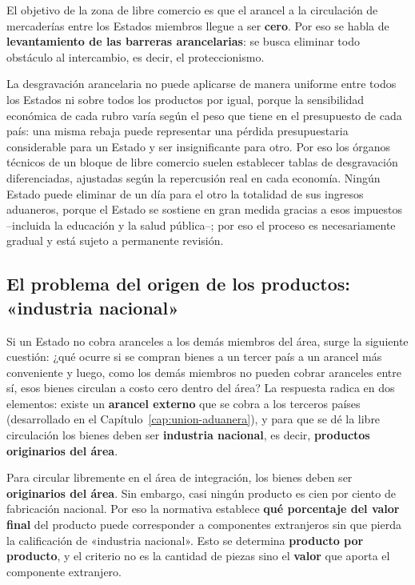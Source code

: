 \documentclass[12pt,oneside]{book}
\begin{document}
\begin{importante}
El objetivo de la zona de libre comercio es que el arancel a la circulación de mercaderías entre los Estados miembros llegue a ser \textbf{cero}. Por eso se habla de \textbf{levantamiento de las barreras arancelarias}: se busca eliminar todo obstáculo al intercambio, es decir, el proteccionismo.
\end{importante}

La desgravación arancelaria no puede aplicarse de manera uniforme entre todos los Estados ni sobre todos los productos por igual, porque la sensibilidad económica de cada rubro varía según el peso que tiene en el presupuesto de cada país: una misma rebaja puede representar una pérdida presupuestaria considerable para un Estado y ser insignificante para otro. Por eso los órganos técnicos de un bloque de libre comercio suelen establecer tablas de desgravación diferenciadas, ajustadas según la repercusión real en cada economía. Ningún Estado puede eliminar de un día para el otro la totalidad de sus ingresos aduaneros, porque el Estado se sostiene en gran medida gracias a esos impuestos --incluida la educación y la salud pública--; por eso el proceso es necesariamente gradual y está sujeto a permanente revisión.

\subsection{El problema del origen de los productos: «industria nacional»}

Si un Estado no cobra aranceles a los demás miembros del área, surge la siguiente cuestión: ¿qué ocurre si se compran bienes a un tercer país a un arancel más conveniente y luego, como los demás miembros no pueden cobrar aranceles entre sí, esos bienes circulan a costo cero dentro del área? La respuesta radica en dos elementos: existe un \textbf{arancel externo} que se cobra a los terceros países (desarrollado en el Capítulo~\ref{cap:union-aduanera}), y para que se dé la libre circulación los bienes deben ser \textbf{industria nacional}, es decir, \textbf{productos originarios del área}.

\begin{importante}
Para circular libremente en el área de integración, los bienes deben ser \textbf{originarios del área}. Sin embargo, casi ningún producto es cien por ciento de fabricación nacional. Por eso la normativa establece \textbf{qué porcentaje del valor final} del producto puede corresponder a componentes extranjeros sin que pierda la calificación de «industria nacional». Esto se determina \textbf{producto por producto}, y el criterio no es la cantidad de piezas sino el \textbf{valor} que aporta el componente extranjero.
\end{importante}
\end{document}
